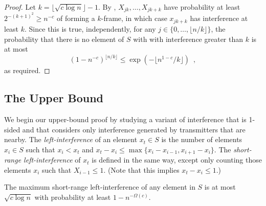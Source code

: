 \documentclass{patmorin}
\begin{document}
\begin{proof}
Let $k=\lfloor \sqrt{c\log n} \rfloor-1$.  By ,
$X_{jk},\ldots,X_{jk+k}$ have probability at least $2^{-(k+1)^2}\ge
n^{-c}$ of forming a $k$-frame, in which case $x_{jk+k}$ has
interference at least $k$.  Since this is true, independently, for any
$j\in\{0,\ldots,\lfloor n/k\rfloor\}$, the probability that there is no
element of $S$ with with interference greater than $k$ is at most
\[
   (1-n^{-c})^{\lfloor n/k\rfloor} \le \exp(-\lfloor n^{1-c}/k\rfloor) \enspace ,
\]
as required.
\end{proof}


\subsection{The Upper Bound}

We begin our upper-bound proof by studying a variant of interference that
is 1-sided and that considers only interference generated by transmitters
that are nearby.  The \emph{left-interference} of an element $x_t\in
S$ is the number of elements $x_i\in S$ such that $x_i < x_t$ and
$x_t-x_i \le \max\{x_i-x_{i-1},x_{i+1}-x_i\}$.  The \emph{short-range
left-interference} of $x_t$ is defined in the same way, except only
counting those elements $x_i$ such that $X_{i-1} \le 1$. (Note that this
implies $x_t-x_i \le 1$.)

\begin{lem}
The maximum short-range left-interference of any element in $S$ is at
most $\sqrt{c\log n}$ with probability at least $1-n^{-\Omega(c)}$.
\end{lem}
\end{document}
